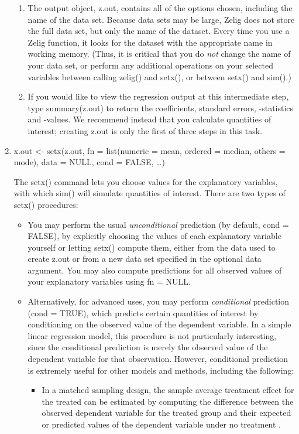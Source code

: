 \documentclass[letterpaper,10pt,english]{sphinxmanual}
\begin{document}
\begin{enumerate}
\begin{enumerate}
\item {} 
The output object, z.out, contains all of the options chosen,
including the name of the data set. Because data sets may be
large, Zelig does not store the full data set, but only the name
of the dataset. Every time you use a Zelig function, it looks for
the dataset with the appropriate name in working memory. (Thus, it
is critical that you do \emph{not} change the name of your data set, or
perform any additional operations on your selected variables
between calling zelig() and setx(), or between setx() and sim().)

\item {} 
If you would like to view the regression output at this
intermediate step, type summary(z.out) to return the coefficients,
standard errors, -statistics and -values. We
recommend instead that you calculate quantities of interest;
creating z.out is only the first of three steps in this task.

\end{enumerate}

\item {} 
x.out \textless{}- setx(z.out, fn = list(numeric = mean, ordered = median,
others = mode), data = NULL, cond = FALSE, …)

The setx() command lets you choose values for the explanatory
variables, with which sim() will simulate quantities of interest.
There are two types of setx() procedures:
\begin{itemize}
\item {} 
You may perform the usual \emph{unconditional} prediction (by default,
cond = FALSE), by explicitly choosing the values of each
explanatory variable yourself or letting setx() compute them,
either from the data used to create z.out or from a new data set
specified in the optional data argument. You may also compute
predictions for all observed values of your explanatory variables
using fn = NULL.

\item {} 
Alternatively, for advanced uses, you may perform \emph{conditional}
prediction (cond = TRUE), which predicts certain quantities of
interest by conditioning on the observed value of the dependent
variable. In a simple linear regression model, this procedure is
not particularly interesting, since the conditional prediction is
merely the observed value of the dependent variable for that
observation. However, conditional prediction is extremely useful
for other models and methods, including the following:
\begin{itemize}
\item {} 
In a matched sampling design, the sample average treatment
effect for the treated can be estimated by computing the
difference between the observed dependent variable for the
treated group and their expected or predicted values of the
dependent variable under no treatment .


\end{itemize}
\end{itemize}
\end{enumerate}
\end{document}
